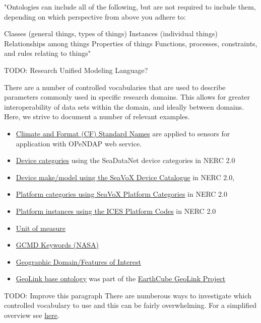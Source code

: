 \documentclass[]{book}
\begin{document}
"Ontologies can include all of the following, but are not required to include them, depending on which perspective from above you adhere to:

Classes (general things, types of things)
Instances (individual things)
Relationships among things
Properties of things
Functions, processes, constraints, and rules relating to things"

TODO: Research Unified Modeling Language?

There are a number of controlled vocabularies that are used to describe parameters commonly used in specific research domains. This allows for greater interoperability of data sets within the domain, and ideally between domains. Here, we strive to document a number of relevant examples.

\begin{itemize}
\item
  \href{\%22http://cfconventions.org/standard-names.html\%22}{Climate and Format (CF) Standard Names} are applied to sensors for application with OPeNDAP web service.
\item
  \href{\%22http://vocab.nerc.ac.uk/collection/L05/current/\%22}{Device categories} using the SeaDataNet device categories in NERC 2.0
\item
  \href{\%22http://vocab.nerc.ac.uk/collection/L22/current/\%22}{Device make/model using the SeaVoX Device Catalogue} in NERC 2.0,
\item
  \href{\%22http://vocab.nerc.ac.uk/collection/L06/current/\%22}{Platform categories using SeaVoX Platform Categories} in NERC 2.0
\item
  \href{\%22http://vocab.nerc.ac.uk/collection/C17/current/\%22}{Platform instances using the ICES Platform Codes} in NERC 2.0
\item
  \href{\%22http://vocab.nerc.ac.uk/collection/P06/current/\%22}{Unit of measure}
\item
  \href{\%22http://vocab.nerc.ac.uk/collection/P04/current/\%22}{GCMD Keywords (NASA)}
\item
  \href{\%22http://vocab.nerc.ac.uk/collection/C19/current/\%22}{Geographic Domain/Features of Interest}
\item
  \href{http://schema.geolink.org/1.0/base/main.html}{GeoLink base ontology} was part of the \href{http://www.geolink.org/}{EarthCube GeoLink Project}
\end{itemize}

TODO: Improve this paragraph
There are numberous ways to investigate which controlled vocabulary to use and this can be fairly overwhelming. For a simplified overview see \href{\%22http://seadatanet.maris2.nl/v_bodc_vocab_v2/vocab_relations.asp?lib=P08\%22}{here}.
\end{document}
